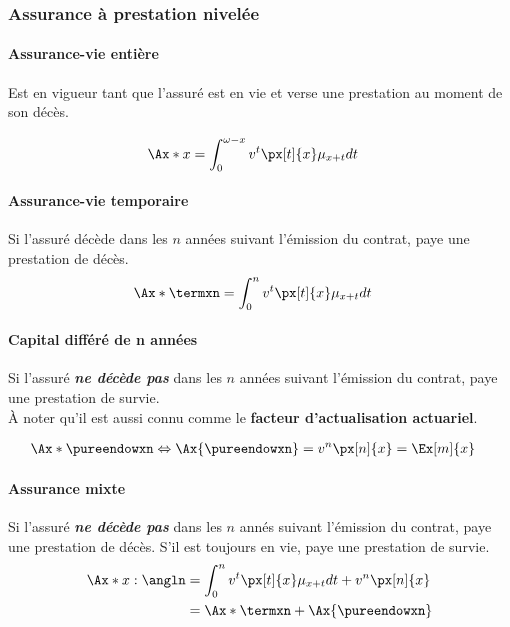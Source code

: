 \documentclass[10pt, french]{article}
\begin{document}
\begin{multicols*}{3}
\subsubsection*{\textcolor{amber(sae/ece)}{Assurance à prestation nivelée}}

\paragraph{Assurance-vie entière} 

Est en vigueur tant que l'assuré est en vie et verse une prestation au moment de son décès.

\begin{align*}
\Ax*{x} 
	&= \int_{0}^{\omega - x} v^t \px[t]{x} \mu_{x+t} dt 
\end{align*}

\paragraph{Assurance-vie temporaire} Si l'assuré décède dans les $n$ années suivant l'émission du contrat, paye une prestation de décès.
\begin{align*}
\Ax*{\termxn}	
	&= \int_{0}^{n} v^t \px[t]{x} \mu_{x+t} dt 
\end{align*}

\paragraph{Capital différé de n années} Si l'assuré \textbf{\textit{ne décède pas}} dans les $n$ années suivant l'émission du contrat, paye une prestation de survie.\\
À noter qu'il est aussi connu comme le \textbf{facteur d'actualisation actuariel}.

\begin{align*}
	\Ax*{\pureendowxn}	
		&\Leftrightarrow \Ax{\pureendowxn}
		= v^{n} \px[n]{x} 
		= \Ex[m]{x}
\end{align*}

\paragraph{Assurance mixte} Si l'assuré \textbf{\textit{ne décède pas}} dans les $n$ annés suivant l'émission du contrat, paye une prestation de décès. S'il est toujours en vie, paye une prestation de survie.
\begin{align*}
\Ax*{x:\angln}	
	&= \int_{0}^{n} v^t \px[t]{x} \mu_{x+t} dt + v^n \px[n]{x} \\
	&= \Ax*{\termxn} + \Ax{\pureendowxn} 
\end{align*}


\end{multicols*}
\end{document}
